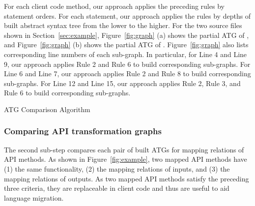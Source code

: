 For each client code method, our approach applies the preceding
rules by statement orders. For each statement, our approach applies
the rules by depths of built abstract syntax tree from the lower to
the higher. For the two source files shown in
Section~\ref{sec:example}, Figure~\ref{fig:graph} (a) shows the
partial ATG of , and Figure~\ref{fig:graph}
(b) shows the partial ATG of .
Figure~\ref{fig:graph} also lists corresponding line numbers of each
sub-graph. In particular, for Line 4 and Line 9, our approach
applies Rule 2 and Rule 6 to build corresponding sub-graphs. For
Line 6 and Line 7, our approach applies Rule 2 and Rule 8 to build
corresponding sub-graphs. For Line 12 and Line 15, our approach
applies Rule 2, Rule 3, and Rule 6 to build corresponding
sub-graphs.
\begin{algorithm}[t]
\begin{SmallOut}
\label{alg:mapATG} \dontprintsemicolon
 \end{SmallOut}
\caption{ATG Comparison Algorithm}
\end{algorithm}

\subsubsection{Comparing API transformation graphs} The
second sub-step compares each pair of built ATGs for mapping
relations of API methods. As shown in Figure~\ref{fig:example}, two
mapped API methods have (1) the same functionality, (2) the mapping
relations of inputs, and (3) the mapping relations of outputs. As
two mapped API methods satisfy the preceding three criteria, they
are replaceable in client code and thus are useful to aid language
migration.

